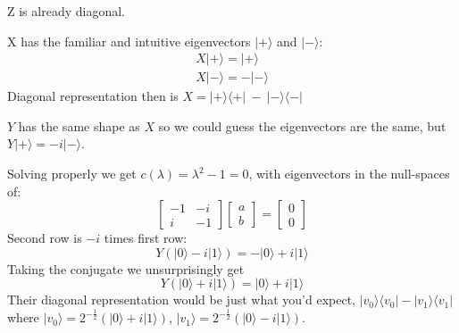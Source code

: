 \documentclass[]{article}
\begin{document}
Z is already diagonal.

X has the familiar and intuitive eigenvectors $|+\rangle$ and $|-\rangle$:
\begin{align*}
X|+\rangle = |+\rangle \\
X|-\rangle = -|-\rangle
\end{align*}
Diagonal representation then is $X = |+\rangle\langle+|\ -\ |-\rangle\langle-|$

$Y$ has the same shape as $X$ so we could guess the eigenvectors are the same, but $Y|+\rangle = -i|-\rangle$.

Solving properly we get $c(\lambda) = \lambda^2 - 1 = 0$, with eigenvectors in the null-spaces of:
\[
\left[\begin{matrix}-1&-i\\i&-1\end{matrix}\right]
\left[\begin{matrix}a\\b\end{matrix}\right]
=\left[\begin{matrix}0\\0\end{matrix}
\right]
\]
Second row is $-i$ times first row:
\[Y(|0\rangle -i |1\rangle) = -|0\rangle +i|1\rangle\]
Taking the conjugate we unsurprisingly get
\[Y(|0\rangle +i |1\rangle) = |0\rangle +i|1\rangle\]
Their diagonal representation would be just what you'd expect, $|v_0\rangle\langle v_0| - |v_1\rangle\langle v_1|$ where $|v_0\rangle = 2^{-\frac{1}{2}}\left(|0\rangle + i|1\rangle\right)$, $|v_1\rangle = 2^{-\frac{1}{2}}\left(|0\rangle - i|1\rangle\right)$.
\end{document}
